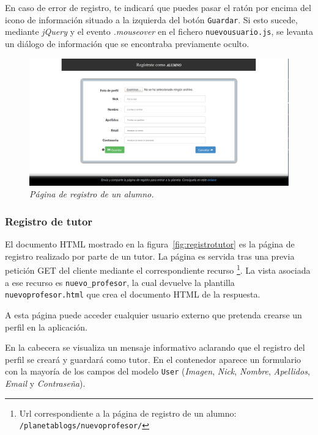 \documentclass[a4paper, 12pt]{book}
\begin{document}
En caso de error de registro, te indicar\'a que puedes pasar el rat\'on por encima del icono de informaci\'on situado a la izquierda del bot\'on 
\texttt{Guardar}. Si esto sucede, mediante \textit{jQuery} y el evento \textit{.mouseover} en el fichero \texttt{nuevousuario.js}, se levanta un di\'alogo 
de informaci\'on que se encontraba previamente oculto.
\begin{figure}
  \centering
  \includegraphics[width=17cm, keepaspectratio]{imagenes/RegistroAlumno}
  \caption{\textit{P\'agina de registro de un alumno.}}
  \label{fig:registroalumno}
\end{figure}


\subsubsection{Registro de tutor} 
\label{sec:registrotutor}
El documento HTML mostrado en la figura~\ref{fig:registrotutor} es la p\'agina de registro realizado por parte de un tutor. La p\'agina es servida 
tras una previa petici\'on GET del cliente mediante el correspondiente recurso \footnote{Url correspondiente a la p\'agina de registro de un alumno: 
\texttt{/planetablogs/nuevoprofesor/}}. La vista asociada a ese recurso es \texttt{nuevo\_profesor}, la cual devuelve la plantilla 
\texttt{nuevoprofesor.html} que crea el documento HTML de la respuesta.

A esta p\'agina puede acceder cualquier usuario externo que pretenda crearse un perfil en la aplicaci\'on.

En la cabecera se visualiza un mensaje informativo aclarando que el registro del perfil se crear\'a y guardar\'a como tutor. En el contenedor aparece un
formulario con la mayor\'ia de los campos del modelo \texttt{User} (\textit{Imagen}, \textit{Nick}, \textit{Nombre}, \textit{Apellidos}, \textit{Email} y 
\textit{Contrase\~na}).
\end{document}
